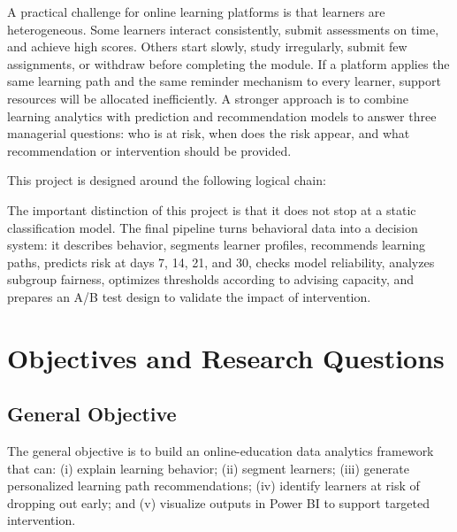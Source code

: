 \documentclass[conference]{IEEEtran}
\begin{document}
A practical challenge for online learning platforms is that learners are heterogeneous. Some learners interact consistently, submit assessments on time, and achieve high scores. Others start slowly, study irregularly, submit few assignments, or withdraw before completing the module. If a platform applies the same learning path and the same reminder mechanism to every learner, support resources will be allocated inefficiently. A stronger approach is to combine learning analytics with prediction and recommendation models to answer three managerial questions: who is at risk, when does the risk appear, and what recommendation or intervention should be provided.

This project is designed around the following logical chain:

\begin{center}
\end{center}

The important distinction of this project is that it does not stop at a static classification model. The final pipeline turns behavioral data into a decision system: it describes behavior, segments learner profiles, recommends learning paths, predicts risk at days 7, 14, 21, and 30, checks model reliability, analyzes subgroup fairness, optimizes thresholds according to advising capacity, and prepares an A/B test design to validate the impact of intervention.

\section{Objectives and Research Questions}

\subsection{General Objective}

The general objective is to build an online-education data analytics framework that can: (i) explain learning behavior; (ii) segment learners; (iii) generate personalized learning path recommendations; (iv) identify learners at risk of dropping out early; and (v) visualize outputs in Power BI to support targeted intervention.
\end{document}
